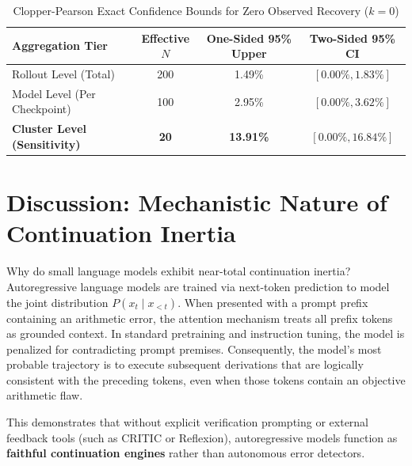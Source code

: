 \documentclass[10pt,conference]{IEEEtran}
\begin{document}
\begin{table}[htbp]
\caption{Clopper-Pearson Exact Confidence Bounds for Zero Observed Recovery ($k=0$)}
\label{tab:clopper}
\centering
\begin{tabular}{lccc}
\toprule
\textbf{Aggregation Tier} & \textbf{Effective $N$} & \textbf{One-Sided 95\% Upper} & \textbf{Two-Sided 95\% CI} \\
\midrule
Rollout Level (Total) & 200 & 1.49\% & $[0.00\%, 1.83\%]$ \\
Model Level (Per Checkpoint) & 100 & 2.95\% & $[0.00\%, 3.62\%]$ \\
\textbf{Cluster Level (Sensitivity)} & \textbf{20} & \textbf{13.91\%} & $\mathbf{[0.00\%, 16.84\%]}$ \\
\bottomrule
\end{tabular}
\end{table}

\section{Discussion: Mechanistic Nature of Continuation Inertia}
Why do small language models exhibit near-total continuation inertia?
Autoregressive language models are trained via next-token prediction to model the joint distribution $P(x_t \mid x_{<t})$. When presented with a prompt prefix containing an arithmetic error, the attention mechanism treats all prefix tokens as grounded context. In standard pretraining and instruction tuning, the model is penalized for contradicting prompt premises. Consequently, the model's most probable trajectory is to execute subsequent derivations that are logically consistent with the preceding tokens, even when those tokens contain an objective arithmetic flaw.

This demonstrates that without explicit verification prompting or external feedback tools (such as CRITIC or Reflexion), autoregressive models function as \textbf{faithful continuation engines} rather than autonomous error detectors.
\end{document}
